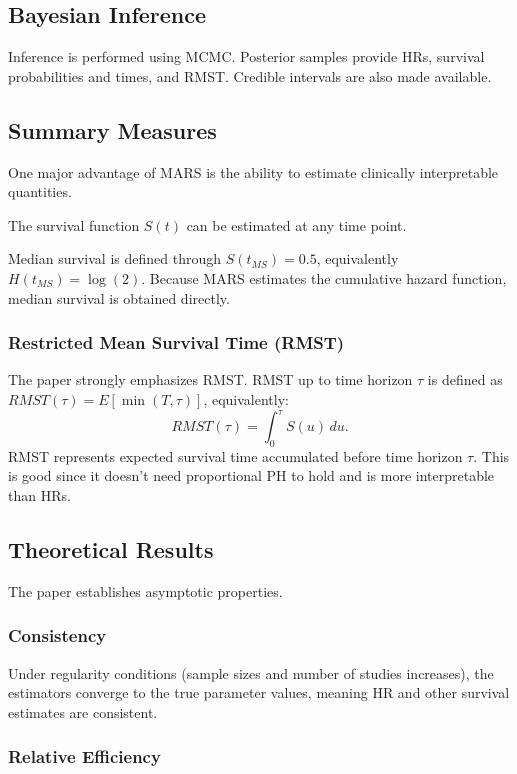 \documentclass[11pt]{article}
\begin{document}
\subsection*{Bayesian Inference}

Inference is performed using MCMC. Posterior samples provide HRs, survival probabilities and times, and RMST. Credible intervals are also made available.

\subsection*{Summary Measures}

One major advantage of MARS is the ability to estimate clinically interpretable quantities.

The survival function $S(t)$ can be estimated at any time point.

Median survival is defined through $S(t_{MS})=0.5$, equivalently $H(t_{MS})=\log(2)$. Because MARS estimates the cumulative hazard function, median survival is obtained directly.

\subsubsection*{Restricted Mean Survival Time (RMST)}

The paper strongly emphasizes RMST. RMST up to time horizon $\tau$ is defined as $RMST(\tau)=E[\min(T,\tau)]$, equivalently: \[RMST(\tau)=\int_0^\tau S(u)\,du.\]
RMST represents expected survival time accumulated before time horizon \(\tau\). This is good since it doesn't need proportional PH to hold and is more interpretable than HRs.

\subsection*{Theoretical Results}

The paper establishes asymptotic properties.

\subsubsection*{Consistency}

Under regularity conditions (sample sizes and number of studies increases),  the estimators converge to the true parameter values, meaning HR and other survival estimates are consistent.

\subsubsection*{Relative Efficiency}
\end{document}
